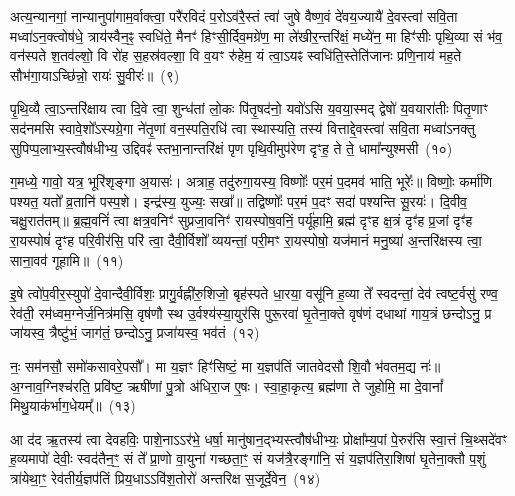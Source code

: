 {\anuvakamend[{गा॒तु॒विद॒भ्येक॑त्रिꣳशच्च}]}%

अत्य॒न्यानगां॒ नान्यानुपा॑गाम॒र्वाक्त्वा॒ परै॑रविदं प॒रो\-ऽव॑रै॒स्तं त्वा॑ जुषे वैष्ण॒वं दे॑वय॒ज्यायै॑ दे॒वस्त्वा॑ सवि॒ता मध्वा॑\-ऽन॒क्त्वोष॑धे॒ त्राय॑स्वैन॒ꣴ॒ स्वधि॑ते॒ मैनꣳ॑ हिꣳसी॒र्दिव॒मग्रे॑ण॒ मा ले॑खीर॒न्तरि॑क्षं॒ मध्ये॑न॒ मा हिꣳ॑सीः पृथि॒व्या सं भ॑व॒ वन॑स्पते श॒तव॑ल्\mbox{}शो॒ वि रो॑ह स॒हस्र॑वल्\mbox{}शा॒ वि व॒यꣳ रु॑हेम॒ यं त्वा॒\-ऽयꣴ स्वधि॑ति॒स्तेति॑जानः प्रणि॒नाय॑ मह॒ते सौभ॑गा॒या\-ऽच्छि॑न्नो॒ रायः॑ सु॒वीरः॑॥~(९)

{\anuvakamend[{यं दश॑ च}]}%

पृ॒थि॒व्यै त्वा॒\-ऽन्तरि॑क्षाय त्वा दि॒वे त्वा॒ शुन्ध॑तां लो॒कः पि॑तृ॒षद॑नो॒ यवो॑\-ऽसि य॒वया॒स्मद् द्वेषो॑ य॒वयारा॑तीः पितृ॒णाꣳ सद॑नमसि स्वावे॒शो᳚\-ऽस्यग्रे॒गा ने॑तृ॒णां वन॒स्पति॒रधि॑ त्वा स्थास्यति॒ तस्य॑ वित्ताद्दे॒वस्त्वा॑ सवि॒ता मध्वा॑\-ऽनक्तु सुपिप्प॒लाभ्य॒स्त्वौष॑धीभ्य॒ उद्दिवꣴ॑ स्तभा॒नान्तरि॑क्षं पृण पृथि॒वीमुप॑रेण दृꣳह॒ ते ते॒ धामा᳚न्युश्मसी~(१०)

ग॒मध्ये॒ गावो॒ यत्र॒ भूरि॑शृङ्गा अ॒यासः॑। अत्राह॒ तदु॑रुगा॒यस्य॒ विष्णोः᳚ पर॒मं प॒दमव॑ भाति॒ भूरेः᳚॥ विष्णोः॒ कर्मा॑णि पश्यत॒ यतो᳚ व्र॒तानि॑ पस्प॒शे। इन्द्र॑स्य॒ युज्यः॒ सखा᳚॥ तद्विष्णोः᳚ पर॒मं प॒दꣳ सदा॑ पश्यन्ति सू॒रयः॑। दि॒वीव॒ चक्षु॒रात॑तम्॥ ब्र॒ह्म॒वनिं॑ त्वा क्षत्र॒वनिꣳ॑ सुप्रजा॒वनिꣳ॑ रायस्पोष॒वनिं॒ पर्यू॑हामि॒ ब्रह्म॑ दृꣳह क्ष॒त्रं दृꣳ॑ह प्र॒जां दृꣳ॑ह रा॒यस्पोषं॑ दृꣳह परि॒वीर॑सि॒ परि॑ त्वा॒ दैवी॒र्विशो᳚ व्ययन्तां॒ परी॒मꣳ रा॒यस्पोषो॒ यज॑मानं मनु॒ष्या॑ अ॒न्तरि॑क्षस्य त्वा॒ साना॒वव॑ गूहामि॥~(११)

{\anuvakamend[{उ॒श्म॒सी॒ पोष॒मेका॒न्नविꣳ॑श॒तिश्च॑}]}%

इ॒षे त्वो॑प॒वीर॒स्युपो॑ दे॒वान्दैवी॒र्विशः॒ प्रागु॒र्वह्नी॑रु॒शिजो॒ बृह॑स्पते धा॒रया॒ वसू॑नि ह॒व्या ते᳚ स्वदन्तां॒ देव॑ त्वष्ट॒र्वसु॑ रण्व॒ रेव॑ती॒ रम॑ध्वम॒ग्नेर्ज॒नित्र॑मसि॒ वृष॑णौ स्थ उ॒र्वश्य॑स्या॒युर॑सि पुरू॒रवा॑ घृ॒तेना॒क्ते वृष॑णं दधाथां गाय॒त्रं छन्दो\-ऽनु॒ प्र जा॑यस्व॒ त्रैष्टु॑भं॒ जाग॑तं॒ छन्दो\-ऽनु॒ प्रजा॑यस्व॒ भव॑तं~(१२)

नः॒ सम॑नसौ॒ समो॑कसावरे॒पसौ᳚। मा य॒ज्ञꣳ हिꣳ॑सिष्टं॒ मा य॒ज्ञप॑तिं जातवेदसौ शि॒वौ भ॑वतम॒द्य नः॑॥ अ॒ग्नाव॒ग्निश्च॑रति॒ प्रवि॑ष्ट॒ ऋषी॑णां पु॒त्रो अ॑धिरा॒ज ए॒षः। स्वा॒हा॒कृत्य॒ ब्रह्म॑णा ते जुहोमि॒ मा दे॒वानां᳚ मिथु॒याक॑र्भाग॒धेयम्᳚॥~(१३)

{\anuvakamend[{भव॑त॒मेक॑त्रिꣳशच्च}]}%

आ द॑द ऋ॒तस्य॑ त्वा देवहविः॒ पाशे॒ना\-ऽ\-ऽर॑भे॒ धर्\mbox{}षा॒ मानु॑षान॒द्भ्यस्त्वौष॑धीभ्यः॒ प्रोक्षा᳚म्य॒पां पे॒रुर॑सि स्वा॒त्तं चि॒थ्सदे॑वꣳ ह॒व्यमापो॑ देवीः॒ स्वद॑तैन॒ꣳ॒ सं ते᳚ प्रा॒णो वा॒युना॑ गच्छता॒ꣳ॒ सं यज॑त्रै॒रङ्गा॑नि॒ सं य॒ज्ञप॑तिरा॒शिषा॑ घृ॒तेना॒क्तौ प॒शुं त्रा॑येथा॒ꣳ॒ रेव॑तीर्य॒ज्ञप॑तिं प्रिय॒धा\-ऽ\-ऽवि॑श॒तोरो॑ अन्तरिक्ष स॒जूर्दे॒वेन॒~(१४)

